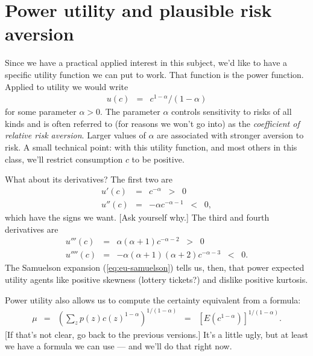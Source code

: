 \documentclass[11pt]{article}
\begin{document}
\section{Power utility and plausible risk aversion}

Since we have a practical applied interest in this subject,
we'd like to have a specific utility function we can put to work.
That function is the power function.
Applied to utility we would write
\begin{eqnarray*}
    u(c) &=& c^{1-\alpha}/(1-\alpha)
\end{eqnarray*}
for some parameter $\alpha > 0$.
The parameter $\alpha$ controls sensitivity to risks of all kinds
and is often referred to (for reasons we won't go into)
as the {\it coefficient of relative risk aversion\/}.
Larger values of $\alpha$ are associated with stronger aversion to risk.
A small technical point:  with this utility function,
and most others in this class,
we'll restrict consumption $c$ to be positive.

What about its derivatives?
The first two are
\begin{eqnarray*}
    u'(c)  &=& c^{-\alpha} \;\;>\;\; 0 \\
    u''(c) &=& -\alpha c^{-\alpha-1} \;\;<\;\; 0 ,
\end{eqnarray*}
which have the signs we want.
[Ask yourself why.]
The third and fourth derivatives are
\begin{eqnarray*}
    u'''(c)  &=& \alpha (\alpha+1) c^{-\alpha-2} \;\;>\;\; 0 \\
    u''''(c) &=& - \alpha (\alpha+1) (\alpha+2) c^{-\alpha-3} \;\;<\;\; 0 .
\end{eqnarray*}
The Samuelson expansion (\ref{eq:eu-samuelson}) tells us, then,
that power expected utility agents like positive skewness (lottery tickets?)
and dislike positive kurtosis.


Power utility also allows us to compute the certainty equivalent from a formula:
\begin{eqnarray}
    \mu &=& \left( \sum_z p(z) c(z)^{1-\alpha} \right)^{1/(1-\alpha)}
        \;\;=\;\; \left[ E (c^{1-\alpha}) \right]^{1/(1-\alpha)} .
    \label{eq:certainty-equivalent-power}
\end{eqnarray}
[If that's not clear, go back to the previous versions.]
It's a little ugly, but at least we have a formula we can use ---
and we'll do that right now.
\end{document}
